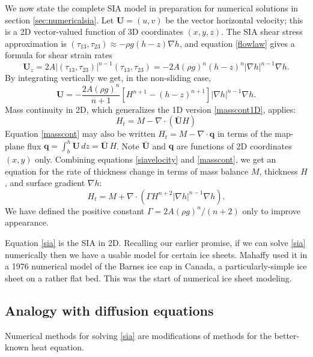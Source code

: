 \documentclass[letterpaper,final,12pt,reqno]{amsart}
\newcommand{\bq}{\mathbf{q}}
\newcommand{\grad}{\nabla}
\newcommand{\Div}{\nabla\cdot}
\begin{document}
We now state the complete SIA model in preparation for numerical solutions in section \ref{sec:numericalsia}.  Let $\mathbf{U} = (u,v)$ be the vector horizontal velocity; this is a 2D vector-valued function of 3D coordinates $(x,y,z)$.  The SIA shear stress approximation is $(\tau_{13},\tau_{23}) \approx - \rho g (h-z) \nabla h$, and equation \eqref{flowlaw} gives a formula for shear strain rates
\begin{equation*}
\mathbf{U}_z = 2 A |(\tau_{13},\tau_{23})|^{n-1} (\tau_{13},\tau_{23}) = - 2 A (\rho g)^n (h-z)^n |\nabla h|^{n-1} \nabla h.
\end{equation*}
By integrating vertically we get, in the non-sliding case,
\begin{equation}
\mathbf{U} = - \frac{2 A (\rho g)^n}{n+1} \left[H^{n+1} - (h-z)^{n+1}\right] |\nabla h|^{n-1} \nabla h.  \label{siavelocity}
\end{equation}
Mass continuity in 2D, which generalizes the 1D version \eqref{masscont1D}, applies:
\begin{equation}
    H_t = M - \Div\left(\bar{\mathbf{U}} H\right)  \label{masscont}
\end{equation}
Equation \eqref{masscont} may also be written $H_t = M - \Div \bq$ in terms of the map-plane flux $\bq = \int_{b}^{h} \mathbf{U}\,dz = \bar{\mathbf{U}}\,H$.  Note $\bar{\mathbf{U}}$ and $\bq$ are functions of 2D coordinates $(x,y)$ only.  Combining equations \eqref{siavelocity} and \eqref{masscont}, we get an equation for the rate of thickness change in terms of mass balance $M$, thickness $H$, and surface gradient $\grad h$:
\begin{equation}
H_t = M + \Div \left(\Gamma H^{n+2} |\grad h|^{n-1} \grad h \right). \label{sia}
\end{equation}
We have defined the positive constant $\Gamma = 2 A (\rho g)^n / (n+2)$ only to improve appearance.

Equation \eqref{sia} is the SIA in 2D.  Recalling our earlier promise, if we can solve \eqref{sia} numerically then we have a usable model for certain ice sheets.  Mahaffy \cite{Mahaffy} used it in a 1976 numerical model of the Barnes ice cap in Canada, a particularly-simple ice sheet on a rather flat bed.  This was the start of numerical ice sheet modeling.

\subsection*{Analogy with diffusion equations}  Numerical methods for solving \eqref{sia} are modifications of methods for the better-known heat equation.
\end{document}
